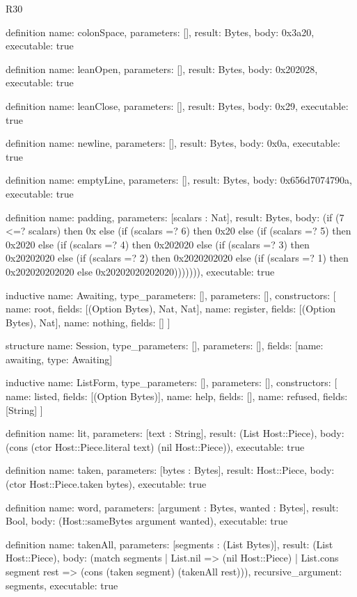 \begin{lexlean}{R30}
\begin{semanticmodule}
definition{
  name: colonSpace,
  parameters: [],
  result: Bytes,
  body: 0x3a20,
  executable: true
}

definition{
  name: leanOpen,
  parameters: [],
  result: Bytes,
  body: 0x202028,
  executable: true
}

definition{
  name: leanClose,
  parameters: [],
  result: Bytes,
  body: 0x29,
  executable: true
}

definition{
  name: newline,
  parameters: [],
  result: Bytes,
  body: 0x0a,
  executable: true
}

definition{
  name: emptyLine,
  parameters: [],
  result: Bytes,
  body: 0x656d7074790a,
  executable: true
}

definition{
  name: padding,
  parameters: [scalars : Nat],
  result: Bytes,
  body: (if (7 <=? scalars) then 0x else (if (scalars =? 6) then 0x20 else (if (scalars =? 5) then 0x2020 else (if (scalars =? 4) then 0x202020 else (if (scalars =? 3) then 0x20202020 else (if (scalars =? 2) then 0x2020202020 else (if (scalars =? 1) then 0x202020202020 else 0x20202020202020))))))),
  executable: true
}

inductive{
  name: Awaiting,
  type_parameters: [],
  parameters: [],
  constructors: [
    {name: root, fields: [(Option Bytes), Nat, Nat]},
    {name: register, fields: [(Option Bytes), Nat]},
    {name: nothing, fields: []}
  ]
}

structure{
  name: Session,
  type_parameters: [],
  parameters: [],
  fields: [{name: awaiting, type: Awaiting}]
}

inductive{
  name: ListForm,
  type_parameters: [],
  parameters: [],
  constructors: [
    {name: listed, fields: [(Option Bytes)]},
    {name: help, fields: []},
    {name: refused, fields: [String]}
  ]
}

definition{
  name: lit,
  parameters: [text : String],
  result: (List Host::Piece),
  body: (cons (ctor Host::Piece.literal text) (nil Host::Piece)),
  executable: true
}

definition{
  name: taken,
  parameters: [bytes : Bytes],
  result: Host::Piece,
  body: (ctor Host::Piece.taken bytes),
  executable: true
}

definition{
  name: word,
  parameters: [argument : Bytes, wanted : Bytes],
  result: Bool,
  body: (Host::sameBytes argument wanted),
  executable: true
}

definition{
  name: takenAll,
  parameters: [segments : (List Bytes)],
  result: (List Host::Piece),
  body: (match segments
    | List.nil => (nil Host::Piece)
    | List.cons segment rest => (cons (taken segment) (takenAll rest))),
  recursive_argument: segments,
  executable: true
}


\end{semanticmodule}
\end{lexlean}
